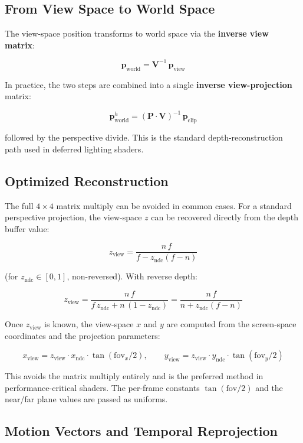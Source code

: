 \documentclass[
  11pt,
  letterpaper,
  DIV=11,
  numbers=noendperiod,
  twoside,
  open=right]{scrreprt}
\begin{document}
\subsection{From View Space to World
Space}\label{from-view-space-to-world-space}

The view-space position transforms to world space via the
\textbf{inverse view matrix}:

\[
\mathbf{p}_{\text{world}} = \mathbf{V}^{-1} \, \mathbf{p}_{\text{view}}
\]

In practice, the two steps are combined into a single \textbf{inverse
view-projection} matrix:

\[
\mathbf{p}_{\text{world}}^{h} = (\mathbf{P} \cdot \mathbf{V})^{-1} \, \mathbf{p}_{\text{clip}}
\]

followed by the perspective divide. This is the standard
depth-reconstruction path used in deferred lighting shaders.

\subsection{Optimized Reconstruction}\label{optimized-reconstruction}

The full \(4 \times 4\) matrix multiply can be avoided in common cases.
For a standard perspective projection, the view-space \(z\) can be
recovered directly from the depth buffer value:

\[
z_{\text{view}} = \frac{n \, f}{f - z_{\text{ndc}} (f - n)}
\]

(for \(z_{\text{ndc}} \in [0, 1]\), non-reversed). With reverse depth:

\[
z_{\text{view}} = \frac{n \, f}{f \, z_{\text{ndc}} + n \, (1 - z_{\text{ndc}})} = \frac{n \, f}{n + z_{\text{ndc}} (f - n)}
\]

Once \(z_{\text{view}}\) is known, the view-space \(x\) and \(y\) are
computed from the screen-space coordinates and the projection
parameters:

\[
x_{\text{view}} = z_{\text{view}} \cdot x_{\text{ndc}} \cdot \tan(\text{fov}_x / 2), \qquad
y_{\text{view}} = z_{\text{view}} \cdot y_{\text{ndc}} \cdot \tan(\text{fov}_y / 2)
\]

This avoids the matrix multiply entirely and is the preferred method in
performance-critical shaders. The per-frame constants
\(\tan(\text{fov}/2)\) and the near/far plane values are passed as
uniforms.

\subsection{Motion Vectors and Temporal
Reprojection}\label{motion-vectors-and-temporal-reprojection}
\end{document}
